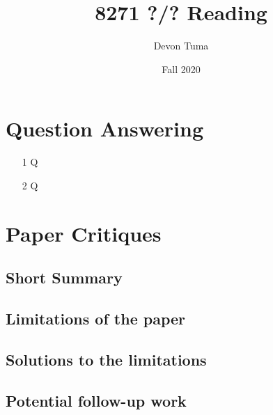 \documentclass[11pt]{article}
\title{8271 ?/? Reading}
\author{Devon Tuma}
\date{Fall 2020}
\begin{document}
\maketitle

\section*{Question Answering}

\begin{itemize}
\item [1] Q
\item [2] Q
\end{itemize}

\section*{Paper Critiques}

\subsection*{Short Summary}

\subsection*{Limitations of the paper}

\subsection*{Solutions to the limitations}

\subsection*{Potential follow-up work}
\end{document}
